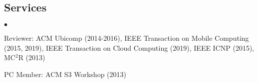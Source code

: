\documentclass[line]{res}
\newenvironment{list1}{
  \begin{list}{\ding{113}}{%
      \setlength{\itemsep}{0in}
      \setlength{\parsep}{0in} \setlength{\parskip}{0in}
      \setlength{\topsep}{0in} \setlength{\partopsep}{0in}
      \setlength{\leftmargin}{0.17in}}}{\end{list}}
\newenvironment{list2}{
  \begin{list}{$\bullet$}{%
      \setlength{\itemsep}{0in}
      \setlength{\parsep}{0in} \setlength{\parskip}{0in}
      \setlength{\topsep}{0in} \setlength{\partopsep}{0in}
      \setlength{\leftmargin}{0.2in}}}{\end{list}}
\begin{document}
\begin{resume}

\section{Services}
\begin{list2}
\item{Reviewer: ACM Ubicomp (2014-2016), IEEE Transaction on Mobile Computing (2015, 2019), IEEE Transaction on Cloud Computing (2019), IEEE ICNP (2015), MC$^2$R (2013)}
\item{PC Member: ACM S3 Workshop (2013)} 
\end{list2}


\end{resume}
\end{document}
